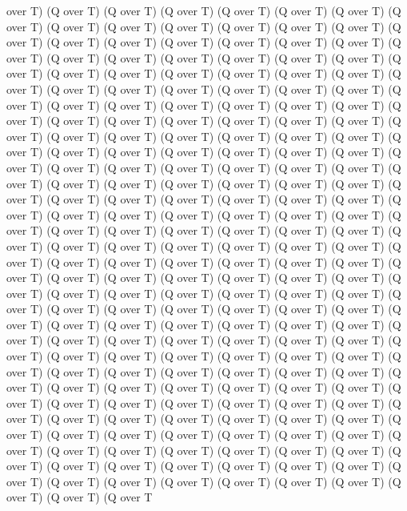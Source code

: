 over T) (Q over T) (Q over T) (Q over T) (Q over T) (Q over T) (Q over T) (Q over T) (Q over T) (Q over T) (Q over T) (Q over T) (Q over T) (Q over T) (Q over T) (Q over T) (Q over T) (Q over T) (Q over T) (Q over T) (Q over T) (Q over T) (Q over T) (Q over T) (Q over T) (Q over T) (Q over T) (Q over T) (Q over T) (Q over T) (Q over T) (Q over T) (Q over T) (Q over T) (Q over T) (Q over T) (Q over T) (Q over T) (Q over T) (Q over T) (Q over T) (Q over T) (Q over T) (Q over T) (Q over T) (Q over T) (Q over T) (Q over T) (Q over T) (Q over T) (Q over T) (Q over T) (Q over T) (Q over T) (Q over T) (Q over T) (Q over T) (Q over T) (Q over T) (Q over T) (Q over T) (Q over T) (Q over T) (Q over T) (Q over T) (Q over T) (Q over T) (Q over T) (Q over T) (Q over T) (Q over T) (Q over T) (Q over T) (Q over T) (Q over T) (Q over T) (Q over T) (Q over T) (Q over T) (Q over T) (Q over T) (Q over T) (Q over T) (Q over T) (Q over T) (Q over T) (Q over T) (Q over T) (Q over T) (Q over T) (Q over T) (Q over T) (Q over T) (Q over T) (Q over T) (Q over T) (Q over T) (Q over T) (Q over T) (Q over T) (Q over T) (Q over T) (Q over T) (Q over T) (Q over T) (Q over T) (Q over T) (Q over T) (Q over T) (Q over T) (Q over T) (Q over T) (Q over T) (Q over T) (Q over T) (Q over T) (Q over T) (Q over T) (Q over T) (Q over T) (Q over T) (Q over T) (Q over T) (Q over T) (Q over T) (Q over T) (Q over T) (Q over T) (Q over T) (Q over T) (Q over T) (Q over T) (Q over T) (Q over T) (Q over T) (Q over T) (Q over T) (Q over T) (Q over T) (Q over T) (Q over T) (Q over T) (Q over T) (Q over T) (Q over T) (Q over T) (Q over T) (Q over T) (Q over T) (Q over T) (Q over T) (Q over T) (Q over T) (Q over T) (Q over T) (Q over T) (Q over T) (Q over T) (Q over T) (Q over T) (Q over T) (Q over T) (Q over T) (Q over T) (Q over T) (Q over T) (Q over T) (Q over T) (Q over T) (Q over T) (Q over T) (Q over T) (Q over T) (Q over T) (Q over T) (Q over T) (Q over T) (Q over T) (Q over T) (Q over T) (Q over T) (Q over T) (Q over T) (Q over T) (Q over T) (Q over T) (Q over T) (Q over T) (Q over T) (Q over T) (Q over T) (Q over T) (Q over T) (Q over T) (Q over T) (Q over T) (Q over T) (Q over T) (Q over T) (Q over T) (Q over T) (Q over T) (Q over T) (Q over T) (Q over T) (Q over T) (Q over T) (Q over T) (Q over T) (Q over T) (Q over T) (Q over T) (Q over T) (Q over T) (Q over T) (Q over T) (Q over T) (Q over T) (Q over T) (Q over T